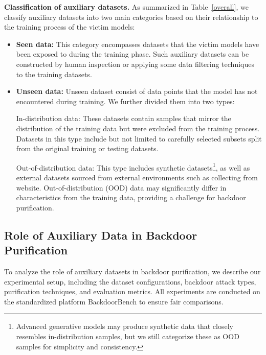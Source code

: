 \textbf{Classification of auxiliary datasets.}
As summarized in Table~\ref{overall}, we classify auxiliary datasets into two main categories based on their relationship to the training process of the victim models:
\begin{itemize}[leftmargin=*, topsep=2pt, itemsep=2pt, partopsep=2pt, parsep=2pt]
    \item \textbf{Seen data:} This category encompasses datasets that the victim models have been exposed to during the training phase. Such auxiliary datasets can be constructed by human inspection or applying some data filtering techniques \cite{chen2019detecting,zeng2022sift, zhu2023vdc} to the training datasets.
    \item \textbf{Unseen data:} Unseen dataset consist of data points that the model has not encountered during training. We further divided them into  two types:
    
     In-distribution data: These datasets contain samples that mirror the distribution of the training data but were excluded from the training process. Datasets in this type include but not limited to carefully selected subsets split from the original training or testing datasets.

     Out-of-distribution data: This type includes synthetic datasets\footnote{Advanced generative models may produce synthetic data that closely resembles in-distribution samples, but we still categorize these as OOD samples for simplicity and consistency.}, as well as external datasets sourced from external environments such as collecting from website. Out-of-distribution (OOD) data may significantly differ in characteristics from the training data, providing a challenge for backdoor purification.

\end{itemize}

\subsection{Role of Auxiliary Data in Backdoor Purification}
\label{sec::impact}

To analyze the role of auxiliary datasets in backdoor purification, we describe our experimental setup, including the dataset configurations, backdoor attack types, purification techniques, and evaluation metrics. All experiments are conducted on the standardized platform BackdoorBench \citep{wubackdoorbench, wu2024backdoorbench} to ensure fair comparisons.

